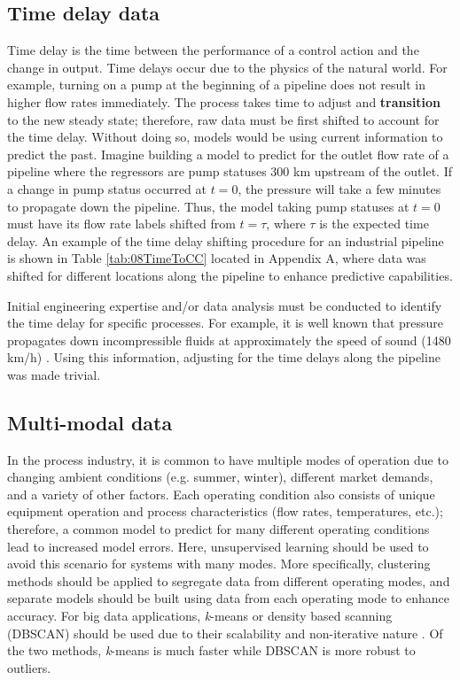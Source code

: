 \subsection{Time delay data}
Time delay is the time between the performance of a control action and the change in output. Time delays occur due to the physics of the natural world.  For example, turning on a pump at the beginning of a pipeline does not result in higher flow rates immediately.  The process takes time to adjust and \textbf{transition} to the new steady state; therefore, raw data must be first shifted to account for the time delay.  Without doing so, models would be using current information to predict the past.  Imagine building a model to predict for the outlet flow rate of a pipeline where the regressors are pump statuses 300 km upstream of the outlet.  If a change in pump status occurred at $t = 0$, the pressure will take a few minutes to propagate down the pipeline.  Thus, the model taking pump statuses at $t = 0$ must have its flow rate labels shifted from $t = \tau$, where $\tau$ is the expected time delay.  An example of the time delay shifting procedure for an industrial pipeline is shown in Table \ref{tab:08TimeToCC} located in Appendix A, where data was shifted for different locations along the pipeline to enhance predictive capabilities.

Initial engineering expertise and/or data analysis must be conducted to identify the time delay for specific processes.  For example, it is well known that pressure propagates down incompressible fluids at approximately the speed of sound (1480 km/h) \cite{fluid_mechanics}.  Using this information, adjusting for the time delays along the pipeline was made trivial.

\subsection{Multi-modal data}
In the process industry, it is common to have multiple modes of operation due to changing ambient conditions (e.g. summer, winter), different market demands, and a variety of other factors.  Each operating condition also consists of unique equipment operation and process characteristics (flow rates, temperatures, etc.); therefore, a common model to predict for many different operating conditions lead to increased model errors.  Here, unsupervised learning should be used to avoid this scenario for systems with many modes.  More specifically, clustering methods should be applied to segregate data from different operating modes, and separate models should be built using data from each operating mode to enhance accuracy.  For big data applications, \textit{k}-means or density based scanning (DBSCAN) should be used due to their scalability and non-iterative nature \cite{clustering_complexity}. Of the two methods, \textit{k}-means is much faster while DBSCAN is more robust to outliers.

